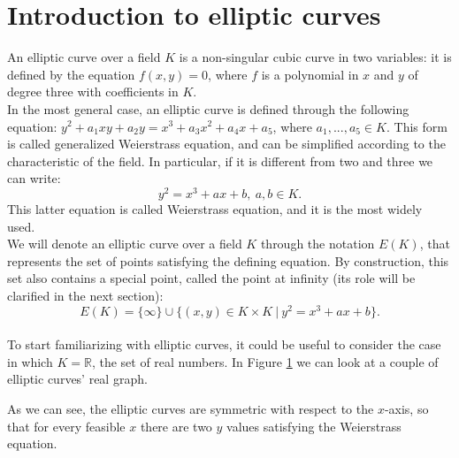 \section{Introduction to elliptic curves}
\label{ec}
An elliptic curve over a field $K$ is a non-singular cubic curve in two variables: it is defined by the equation $f(x, y) = 0$, where $f$ is a polynomial in $x$ and $y$ of degree three with coefficients in $K$.
\\
In the most general case, an elliptic curve is defined through the following equation: $y^2 + a_1xy + a_2y = x^3 + a_3x^2 + a_4x + a_5$, where $a_1, ..., a_5 \in K$. This form is called generalized Weierstrass equation, and can be simplified according to the characteristic of the field. In particular, if it is different from two and three we can write:
$$y^2 = x^3 + ax + b, \ a, b \in K.$$
This latter equation is called Weierstrass equation, and it is the most widely used.
\\
We will denote an elliptic curve over a field $K$ through the notation $E(K)$, that represents the set of points satisfying the defining equation. By construction, this set also contains a special point, called the point at infinity (its role will be clarified in the next section): 
$$E(K) = \{\infty\}\cup\{(x, y) \in K \times K \ | \ y^2 = x^3 + ax + b\}.$$
\\
To start familiarizing with elliptic curves, it could be useful to consider the case in which $K = \mathbb{R}$, the set of real numbers. In Figure \ref{fig:figure1} we can look at a couple of elliptic curves' real graph.
\begin{figure}
	\noindent
	\label{fig:figure1}
\end{figure}
\noindent
As we can see, the elliptic curves are symmetric with respect to the $x$-axis, so that for every feasible $x$ there are two $y$ values satisfying the Weierstrass equation.
